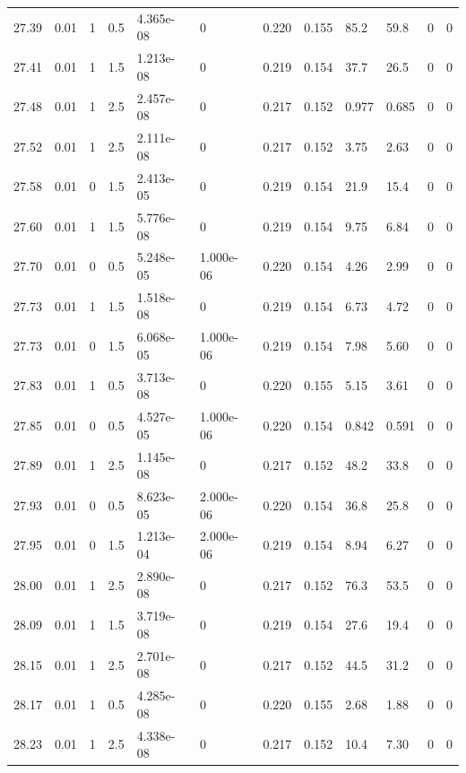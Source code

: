 \documentclass[preview]{standalone}
\begin{document}
{{{{{{{{{{{{{\begin{tabular}{L{1.2cm}C{1.2cm} C{0.3cm}C{0.5cm} C{1.4cm}C{1.4cm} C{1.4cm}C{1.4cm} C{1.6cm}C{1.6cm} C{1.6cm}C{1.6cm}}
  27.39  &  0.01  & 1     & 0.5 &  4.365e-08  & 0  &  0.220&   0.155& 85.2 & 59.8   &  0 & 0  \\ 
  27.41  &  0.01  & 1     & 1.5 &  1.213e-08  & 0  &  0.219&   0.154& 37.7 & 26.5   &  0 & 0  \\ 
  27.48  &  0.01  & 1     & 2.5 &  2.457e-08  & 0  &  0.217&   0.152& 0.977 & 0.685   &  0 & 0  \\ 
  27.52  &  0.01  & 1     & 2.5 &  2.111e-08  & 0  &  0.217&   0.152& 3.75 & 2.63   &  0 & 0  \\ 
  27.58  &  0.01  & 0     & 1.5 &  2.413e-05  & 0  &  0.219&   0.154& 21.9 & 15.4   &  0 & 0  \\ 
  27.60  &  0.01  & 1     & 1.5 &  5.776e-08  & 0  &  0.219&   0.154& 9.75 & 6.84   &  0 & 0  \\ 
  27.70  &  0.01  & 0     & 0.5 &  5.248e-05  & 1.000e-06  &  0.220&   0.154& 4.26 & 2.99   &  0 & 0  \\ 
  27.73  &  0.01  & 1     & 1.5 &  1.518e-08  & 0  &  0.219&   0.154& 6.73 & 4.72   &  0 & 0  \\ 
  27.73  &  0.01  & 0     & 1.5 &  6.068e-05  & 1.000e-06  &  0.219&   0.154& 7.98 & 5.60   &  0 & 0  \\ 
  27.83  &  0.01  & 1     & 0.5 &  3.713e-08  & 0  &  0.220&   0.155& 5.15 & 3.61   &  0 & 0  \\ 
  27.85  &  0.01  & 0     & 0.5 &  4.527e-05  & 1.000e-06  &  0.220&   0.154& 0.842 & 0.591   &  0 & 0  \\ 
  27.89  &  0.01  & 1     & 2.5 &  1.145e-08  & 0  &  0.217&   0.152& 48.2 & 33.8   &  0 & 0  \\ 
  27.93  &  0.01  & 0     & 0.5 &  8.623e-05  & 2.000e-06  &  0.220&   0.154& 36.8 & 25.8   &  0 & 0  \\ 
  27.95  &  0.01  & 0     & 1.5 &  1.213e-04  & 2.000e-06  &  0.219&   0.154& 8.94 & 6.27   &  0 & 0  \\ 
  28.00  &  0.01  & 1     & 2.5 &  2.890e-08  & 0  &  0.217&   0.152& 76.3 & 53.5   &  0 & 0  \\ 
  28.09  &  0.01  & 1     & 1.5 &  3.719e-08  & 0  &  0.219&   0.154& 27.6 & 19.4   &  0 & 0  \\ 
  28.15  &  0.01  & 1     & 2.5 &  2.701e-08  & 0  &  0.217&   0.152& 44.5 & 31.2   &  0 & 0  \\ 
  28.17  &  0.01  & 1     & 0.5 &  4.285e-08  & 0  &  0.220&   0.155& 2.68 & 1.88   &  0 & 0  \\ 
  28.23  &  0.01  & 1     & 2.5 &  4.338e-08  & 0  &  0.217&   0.152& 10.4 & 7.30   &  0 & 0  \\ 

\end{tabular}}}}}}}}}}}}}}
\end{document}
